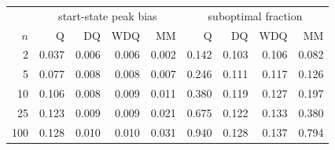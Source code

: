 \begin{tabular}{rrrrrrrrr}\hline
 & \multicolumn{4}{c}{start-state peak bias} & \multicolumn{4}{c}{suboptimal fraction} \\
$n$ & Q & DQ & WDQ & MM & Q & DQ & WDQ & MM \\\hline
2 & 0.037 & 0.006 & 0.006 & 0.002 & 0.142 & 0.103 & 0.106 & 0.082 \\
5 & 0.077 & 0.008 & 0.008 & 0.007 & 0.246 & 0.111 & 0.117 & 0.126 \\
10 & 0.106 & 0.008 & 0.009 & 0.011 & 0.380 & 0.119 & 0.127 & 0.197 \\
25 & 0.123 & 0.009 & 0.009 & 0.021 & 0.675 & 0.122 & 0.133 & 0.380 \\
100 & 0.128 & 0.010 & 0.010 & 0.031 & 0.940 & 0.128 & 0.137 & 0.794 \\
\hline\end{tabular}

